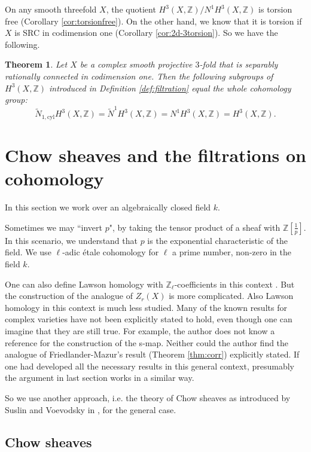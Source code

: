 \documentclass{amsart}
\newtheorem{thm}[theorem]{Theorem}
\theoremstyle{definition}
\theoremstyle{remark}
\newcommand{\mbb}{\mathbb}
\newcommand{\ZZ}{\mbb{Z}}
\newcommand{\cyl}{\text{cyl}}
\begin{document}
On any smooth threefold $X$, the quotient $H^3(X, \ZZ)/N^1H^3(X, \ZZ)$ is torsion free (Corollary \ref{cor:torsionfree}). 
On the other hand, we know that it is torsion if $X$ is SRC in codimension one (Corollary \ref{cor:2d-3torsion}). So we have the following.
\begin{thm}\label{thm:surj_dim3}
Let $X$ be a complex smooth projective $3$-fold that is separably rationally connected in codimension one. Then the following subgroups of $H^{3}(X, \ZZ)$ introduced in Definition \ref{def:filtration} equal the whole cohomology group:
\[
 \tilde{N}_{1, \cyl}H^{3}(X, \ZZ) = \tilde{N}^{1}H^{3}(X, \ZZ) =N^1H^{3}(X, \ZZ)=H^{3}(X, \ZZ).
\]
\end{thm}






\section{Chow sheaves and the filtrations on cohomology}\label{sec:general}
In this section we work over an algebraically closed field $k$. 

Sometimes we may ``invert $p$", by taking the tensor product of a sheaf with $\ZZ[\frac{1}{p}]$. In this scenario, we understand that $p$ is the exponential characteristic of the field.
We use $\ell$-adic \'etale cohomology for $\ell$ a prime number, non-zero in the field $k$. 

One can also define Lawson homology with $\ZZ_\ell$-coefficients in this context \cite{Friedlander_LawsonHomology}. But the construction of the analogue of $Z_r(X)$ is more complicated. 
Also Lawson homology in this context is much less studied.
Many of the known results for complex varieties have not been explicitly stated to hold, even though one can imagine that they are still true.
For example, the author does not know a reference for the construction of the s-map. 
Neither could the author find the analogue of Friedlander-Mazur's result (Theorem \ref{thm:corr}) explicitly stated.
If one had developed all the necessary results in this general context, presumably the argument in last section works in a similar way.

So we use another approach, i.e. the theory of Chow sheaves as introduced by Suslin and Voevodsky in \cite{SV_Chow_Sheaves}, for the general case.

\subsection{Chow sheaves}
\end{document}
